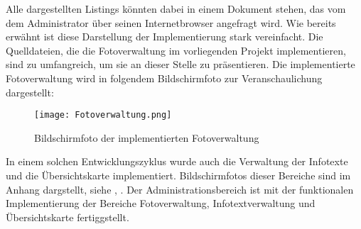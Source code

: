 

Alle dargestellten Listings könnten dabei in einem Dokument stehen, das vom dem Administrator über seinen Internetbrowser angefragt wird.
Wie bereits erwähnt ist diese Darstellung der Implementierung stark vereinfacht. Die Quelldateien, die die Fotoverwaltung im vorliegenden Projekt implementieren, sind zu umfangreich, um sie an dieser Stelle zu präsentieren. Die implementierte Fotoverwaltung wird in folgendem Bildschirmfoto zur Veranschaulichung dargestellt:

\begin{figure}[htb]
\centering
\texttt{[image: Fotoverwaltung.png]}
\caption[Fotoverwaltung]{Bildschirmfoto der implementierten Fotoverwaltung}
\label{fig:Fotoverwaltung}
\end{figure}

In einem solchen Entwicklungszyklus wurde auch die Verwaltung der Infotexte und die Übersichtskarte implementiert. Bildschirmfotos dieser Bereiche sind im Anhang dargstellt, siehe , . Der Administrationsbereich ist mit der funktionalen Implementierung der Bereiche Fotoverwaltung, Infotextverwaltung und Übersichtskarte fertiggstellt.
